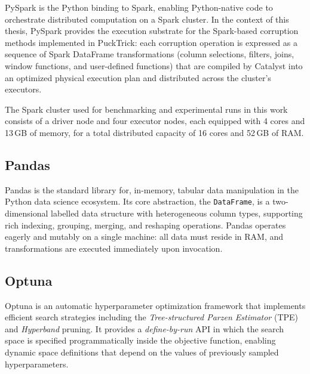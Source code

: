 \documentclass[../main.tex]{subfiles}
\begin{document}
PySpark\supercite{pyspark_docs} is the Python binding to Spark, enabling Python-native code to orchestrate distributed computation on a Spark cluster. In the context of this thesis, PySpark provides the execution substrate for the Spark-based corruption methods implemented in PuckTrick: each corruption operation is expressed as a sequence of Spark DataFrame transformations (column selections, filters, joins, window functions, and user-defined functions)  that are compiled by Catalyst into an optimized physical execution plan and distributed across the cluster's executors.

The Spark cluster used for benchmarking and experimental runs in this work consists of a driver node and four executor nodes, each equipped with 4 cores and 13\,GB of memory, for a total distributed capacity of 16 cores and 52\,GB of RAM.


\subsection{Pandas}
\label{sec:tech-pandas}

Pandas\supercite{pandas_overview} is the standard library for, in-memory, tabular data manipulation in the Python data science ecosystem.  Its core abstraction, the \texttt{DataFrame}, is a two-dimensional labelled data structure with heterogeneous column types, supporting rich indexing, grouping, merging, and reshaping operations.  Pandas operates eagerly and mutably on a single machine: all data must reside in RAM, and transformations are executed immediately upon invocation.


\subsection{Optuna}
\label{sec:tech-optuna}

Optuna\supercite{optuna_website} is an automatic hyperparameter optimization framework that implements efficient search strategies including the \emph{Tree-structured Parzen Estimator} (TPE) and \emph{Hyperband} pruning.
It provides a \emph{define-by-run} API in which the search space is specified programmatically inside the objective function, enabling dynamic space definitions that depend on the values of previously sampled hyperparameters.
\end{document}
